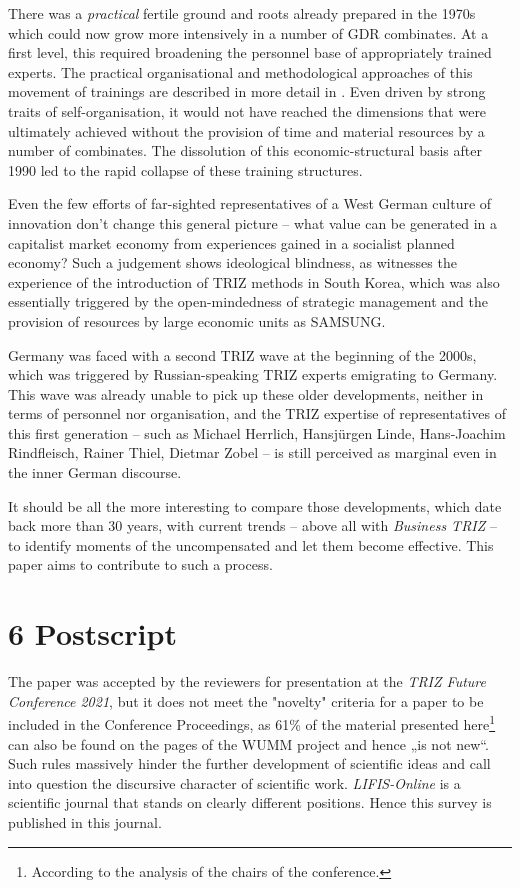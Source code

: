 \documentclass[12pt,a4paper]{article}
\begin{document}
There was a \emph{practical} fertile ground and roots already prepared in the
1970s which could now grow more intensively in a number of GDR combinates. At
a first level, this required broadening the personnel base of appropriately
trained experts. The practical organisational and methodological approaches of
this movement of trainings are described in more detail in \cite{14}.  Even
driven by strong traits of self-organisation, it would not have reached the
dimensions that were ultimately achieved without the provision of time and
material resources by a number of combinates. The dissolution of this
economic-structural basis after 1990 led to the rapid collapse of these
training structures.

Even the few efforts of far-sighted representatives of a West German culture
of innovation don't change this general picture -- what value can be generated
in a capitalist market economy from experiences gained in a socialist planned
economy? Such a judgement shows ideological blindness, as witnesses the
experience of the introduction of TRIZ methods in South Korea, which was also
essentially triggered by the open-mindedness of strategic management and the
provision of resources by large economic units as SAMSUNG.

Germany was faced with a second TRIZ wave at the beginning of the 2000s, which
was triggered by Russian-speaking TRIZ experts emigrating to Germany.  This
wave was already unable to pick up these older developments, neither in terms
of personnel nor organisation, and the TRIZ expertise of representatives of
this first generation -- such as Michael Herrlich, Hansjürgen Linde,
Hans-Joachim Rindfleisch, Rainer Thiel, Dietmar Zobel -- is still perceived as
marginal even in the inner German discourse.

It should be all the more interesting to compare those developments, which
date back more than 30 years, with current trends -- above all with
\emph{Business TRIZ} -- to identify moments of the uncompensated and let them
become effective. This paper aims to contribute to such a process.

\section*{6 Postscript}

The paper was accepted by the reviewers for presentation at the \emph{TRIZ
  Future Conference 2021}, but it does not meet the "novelty" criteria for a
paper to be included in the Conference Proceedings, as 61\% of the material
presented here\footnote{According to the analysis of the chairs of the
  conference.} can also be found on the pages of the WUMM project and hence
„is not new“.  Such rules massively hinder the further development of
scientific ideas and call into question the discursive character of scientific
work. \emph{LIFIS-Online} is a scientific journal that stands on clearly
different positions. Hence this survey is published in this journal.
\end{document}
